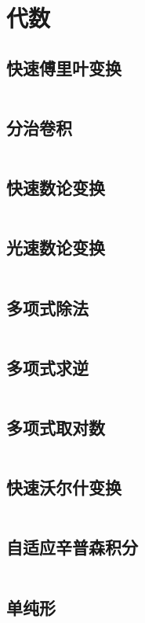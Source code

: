 \section{代数}
\subsection{快速傅里叶变换}
\inputminted{cpp}{\source/algebra/fast-fourier-transform.cpp}
\subsection{分治卷积}
\inputminted{cpp}{\source/algebra/cdq+fft.cpp}
\subsection{快速数论变换}
\inputminted{cpp}{\source/algebra/fast-numerical-transform.cpp}
\subsection{光速数论变换}
\inputminted{cpp}{\source/algebra/NTT+CRT.cpp}
\subsection{多项式除法}
\inputminted{cpp}{\source/algebra/polynomial-divide.cpp}
\subsection{多项式求逆}
\inputminted{cpp}{\source/algebra/polynomial-inverse.cpp}
\subsection{多项式取对数}
\inputminted{cpp}{\source/algebra/expandln.cpp}
\subsection{快速沃尔什变换}
\inputminted{cpp}{\source/algebra/FWT.cpp}
\subsection{自适应辛普森积分}
\inputminted{cpp}{\source/algebra/adaptive-simpsons-method.cpp}
\subsection{单纯形}
\inputminted{cpp}{\source/algebra/simplex.cpp}
